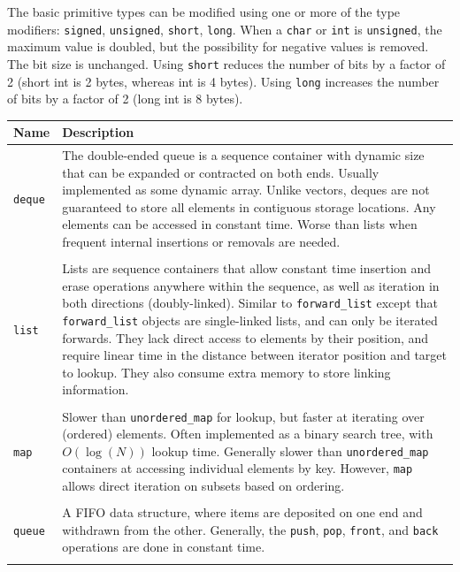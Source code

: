 The basic primitive types can be modified using one or more of the type modifiers: \texttt{signed}, \texttt{unsigned}, \texttt{short}, \texttt{long}. When a \texttt{char} or \texttt{int} is \texttt{unsigned}, the maximum value is doubled, but the possibility for negative values is removed. The bit size is unchanged. Using \texttt{short} reduces the number of bits by a factor of 2 (short int is 2 bytes, whereas int is 4 bytes). Using \texttt{long} increases the number of bits by a factor of 2 (long int is 8 bytes). 

\begin{tabular}{p{}p{}}
	Name & Description \\
	\hline
	\texttt{deque} & The double-ended queue is a sequence container with dynamic size that can be expanded or contracted on both ends. Usually implemented as some dynamic array. Unlike vectors, deques are not guaranteed to store all elements in contiguous storage locations. Any elements can be accessed in constant time. Worse than lists when frequent internal insertions or removals are needed. \\
	\hfill \\
	\texttt{list} & Lists are sequence containers that allow constant time insertion and erase operations anywhere within the sequence, as well as iteration in both directions (doubly-linked). Similar to \texttt{forward\_list} except that \texttt{forward\_list} objects are single-linked lists, and can only be iterated forwards. They lack direct access to elements by their position, and require linear time in the distance between iterator position and target to lookup. They also consume extra memory to store linking information. \\
	\hfill \\
	\texttt{map} & Slower than \texttt{unordered\_map} for lookup, but faster at iterating over (ordered) elements. Often implemented as a binary search tree, with $O(\log(N))$ lookup time. Generally slower than \texttt{unordered\_map} containers at accessing individual elements by key. However, \texttt{map} allows direct iteration on subsets based on ordering. \\
	\hfill \\
	\texttt{queue} & A FIFO data structure, where items are deposited on one end and withdrawn from the other. Generally, the \texttt{push}, \texttt{pop}, \texttt{front}, and \texttt{back} operations are done in constant time. \\
	\hfill \\

\end{tabular}
